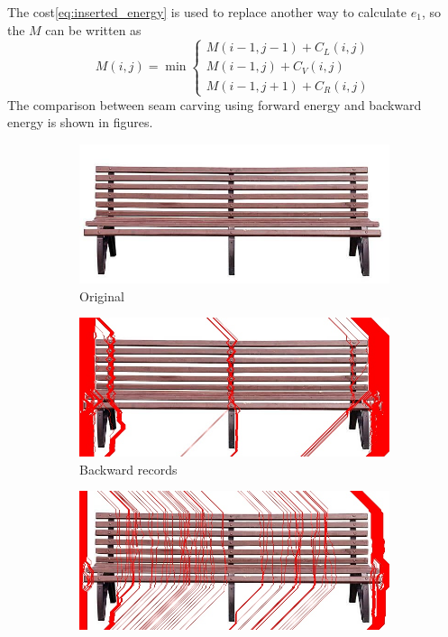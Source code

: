 \documentclass[final]{cvpr}
\begin{document}
\begin{equation}
\end{equation}
The cost\ref{eq:inserted_energy} is used to replace another way to calculate $e_1$, so the $M$ can be written as
\begin{equation}
    M(i,j)=\min
    \begin{cases}
        M(i-1,j-1)+C_L(i,j)\\
        M(i-1,j)+C_V(i,j)\\
        M(i-1,j+1)+C_R(i,j)
    \end{cases}
    \label{eq:forward_transition_function}
\end{equation}
The comparison between seam carving using forward energy and backward energy is shown in figures.
\begin{figure}[htb]
\begin{center}
\begin{subfigure}[b]{0.70\linewidth}
    \includegraphics[width=\textwidth]{bench.jpg}
    \caption{Original}
\end{subfigure}
\begin{subfigure}[b]{0.40\linewidth}
    \includegraphics[width=\textwidth]{bench_seam_carving_backward_records.jpg}
    \caption{Backward records}
\end{subfigure}
\begin{subfigure}[b]{0.40\linewidth}
    \includegraphics[width=\textwidth]{bench_seam_carving_forward_records.jpg}

\end{subfigure}
\end{center}
\end{figure}
\end{document}
